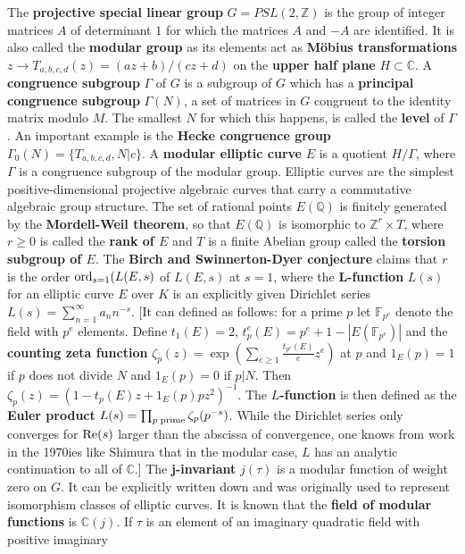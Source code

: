 \documentclass[12pt]{amsart}
\newcounter{example}    \def\example#1{ \item \fontsize{12}{15} \selectfont #1 \fontsize{12}{15} \selectfont }
\begin{document}
The {\bf projective special linear group} $G=PSL(2,\mathbb{Z})$ is the group of integer
matrices $A$ of determinant $1$ for which the matrices $A$ and $-A$ are identified. 
It is also called the {\bf modular group} as its 
elements act as {\bf M\"obius transformations} $z \to T_{a,b,c,d}(z) = (az+b)/(cz+d)$ 
on the {\bf upper half plane} $H \subset \mathbb{C}$. A {\bf congruence subgroup} $\Gamma$ of $G$ 
is a subgroup of $G$ which has a {\bf principal congruence subgroup} $\Gamma(N)$, a set
of matrices in $G$ congruent to the identity matrix modulo $M$. The smallest $N$
for which this happens, is called the {\bf level} of $\Gamma$.
An important example is the {\bf Hecke congruence group} $\Gamma_0(N) =\{ T_{a,b,c,d}, N|c \}$. 
A {\bf modular elliptic curve} $E$ is a quotient $H/\Gamma$, where $\Gamma$ is a 
congruence subgroup of the modular group. Elliptic curves are the simplest positive-dimensional 
projective algebraic curves that carry a commutative algebraic group structure.
The set of rational points $E(\mathbb{Q})$ is finitely generated by the {\bf Mordell-Weil theorem},
so that $E(\mathbb{Q})$ is isomorphic to $\mathbb{Z}^r \times T$, where $r  \geq 0$ is called 
the {\bf rank of $E$} and $T$ is a finite Abelian group called the {\bf torsion subgroup of $E$}. 
The {\bf Birch and Swinnerton-Dyer conjecture} claims that $r$ is the order ${\rm ord}_{s=1}(L(E,s)$ 
of $L(E,s)$ at $s=1$, where the {\bf L-function} $L(s)$ for an elliptic curve $E$ over $K$ is an explicitly
given Dirichlet series $L(s)=\sum_{n=1}^{\infty} a_n n^{-s}$.
[It can defined as follows: for a prime $p$ let $\mathbb{F}_{p^e}$ denote
the field with $p^e$ elements. Define $t_1(E)=2$, $t_p^e(E)=p^e+1-|E(\mathbb{F}_{p^e})|$ and
the {\bf counting zeta function} $\zeta_p(z) = \exp(\sum_{e \geq 1} \frac{t_{p^e}(E)}{e} z^e)$ at $p$
and $1_E(p) = 1$ if $p$ does not divide $N$ and $1_E(p)=0$ if $p|N$. Then 
$\zeta_p(z)=(1-t_p(E) z + 1_E(p) p z^2)^{-1}$. The {\bf $L$-function} is then defined as
the {\bf Euler product} $L(s)=\prod_{p \; {\rm prime}} \zeta_p(p^{-s})$. While the Dirichlet series only 
converges for ${\rm Re}(s)$ larger than the abscissa of convergence, one knows from work in the 1970ies 
like Shimura that in the modular case, $L$ has an analytic continuation to all of $\mathbb{C}$.]
The {\bf j-invariant} $j(\tau)$ is a modular function of weight zero on $G$. It can be explicitly written down
and was originally used to represent isomorphism classes of elliptic curves. It is known that
the {\bf field of modular functions} is $\mathbb{C}(j)$. 
If $\tau$ is an element of an imaginary quadratic field with positive imaginary 
\end{document}
